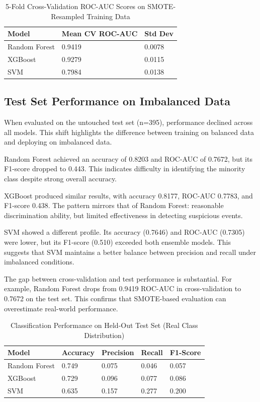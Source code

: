 \begin{table}
\centering
\caption{5-Fold Cross-Validation ROC-AUC Scores on SMOTE-Resampled Training Data}
\label{tab:5F}

\begin{tabular}{| l | l | l |}
\hline
\textbf{Model} & \textbf{Mean CV ROC-AUC} & \textbf{Std Dev} \\
\hline
Random Forest & 0.9419 & 0.0078 \\
\hline
XGBoost & 0.9279 & 0.0115 \\
\hline
SVM & 0.7984 & 0.0138 \\
\hline

\end{tabular}

\end{table}

\subsection{Test Set Performance on Imbalanced Data}
When evaluated on the untouched test set (n=395), performance declined across all models. This shift highlights the difference between training on balanced data and deploying on imbalanced data.

Random Forest achieved an accuracy of 0.8203 and ROC-AUC of 0.7672, but its F1-score dropped to 0.443. This indicates difficulty in identifying the minority class despite strong overall accuracy.

XGBoost produced similar results, with accuracy 0.8177, ROC-AUC 0.7783, and F1-score 0.438. The pattern mirrors that of Random Forest: reasonable discrimination ability, but limited effectiveness in detecting suspicious events.

SVM showed a different profile. Its accuracy (0.7646) and ROC-AUC (0.7305) were lower, but its F1-score (0.510) exceeded both ensemble models. This suggests that SVM maintains a better balance between precision and recall under imbalanced conditions.

The gap between cross-validation and test performance is substantial. For example, Random Forest drops from 0.9419 ROC-AUC in cross-validation to 0.7672 on the test set. This confirms that SMOTE-based evaluation can overestimate real-world performance.



\begin{table}
\centering
\caption{Classification Performance on Held-Out Test Set (Real Class Distribution)}
\label{tab:realclass}

\begin{tabular}{| l | l | l | l | l |}
\hline
\textbf{Model} & \textbf{Accuracy} & \textbf{Precision} & \textbf{Recall} & \textbf{F1-Score} \\
\hline
Random Forest & 0.749 & 0.075 & 0.046 & 0.057 \\
\hline
XGBoost & 0.729 & 0.096 & 0.077 & 0.086 \\
\hline
SVM & 0.635 & 0.157 & 0.277 & 0.200 \\
\hline

\end{tabular}

\end{table}

